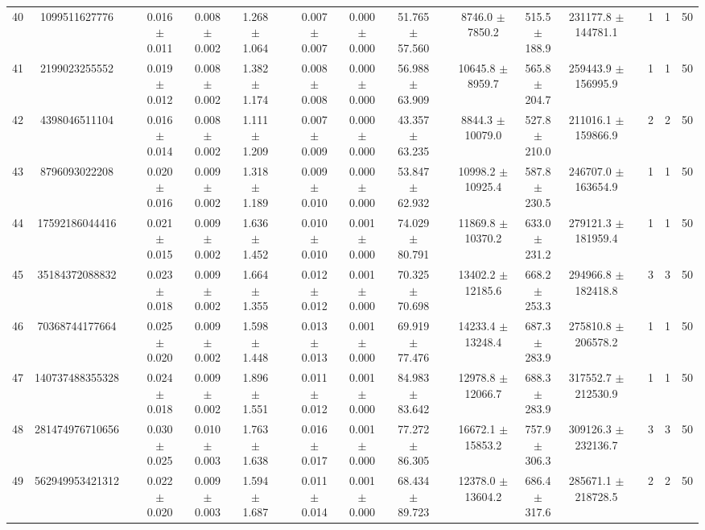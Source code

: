 \documentclass[11pt]{article}
\begin{document}
\begin{landscape}
\begin{table}
\begin{tabular}{cccccccccccccccccc}
40 & 1099511627776 &&  0.016 $\pm$ 0.011 & 0.008 $\pm$ 0.002 & 1.268 $\pm$ 1.064 &&  0.007 $\pm$ 0.007 & 0.000 $\pm$ 0.000 & 51.765 $\pm$ 57.560 &&  8746.0 $\pm$ 7850.2 & 515.5 $\pm$ 188.9 & 231177.8 $\pm$ 144781.1 && 1& 1& 50\\
41 & 2199023255552 &&  0.019 $\pm$ 0.012 & 0.008 $\pm$ 0.002 & 1.382 $\pm$ 1.174 &&  0.008 $\pm$ 0.008 & 0.000 $\pm$ 0.000 & 56.988 $\pm$ 63.909 &&  10645.8 $\pm$ 8959.7 & 565.8 $\pm$ 204.7 & 259443.9 $\pm$ 156995.9 && 1& 1& 50\\
42 & 4398046511104 &&  0.016 $\pm$ 0.014 & 0.008 $\pm$ 0.002 & 1.111 $\pm$ 1.209 &&  0.007 $\pm$ 0.009 & 0.000 $\pm$ 0.000 & 43.357 $\pm$ 63.235 &&  8844.3 $\pm$ 10079.0 & 527.8 $\pm$ 210.0 & 211016.1 $\pm$ 159866.9 && 2& 2& 50\\
43 & 8796093022208 &&  0.020 $\pm$ 0.016 & 0.009 $\pm$ 0.002 & 1.318 $\pm$ 1.189 &&  0.009 $\pm$ 0.010 & 0.000 $\pm$ 0.000 & 53.847 $\pm$ 62.932 &&  10998.2 $\pm$ 10925.4 & 587.8 $\pm$ 230.5 & 246707.0 $\pm$ 163654.9 && 1& 1& 50\\
44 & 17592186044416 &&  0.021 $\pm$ 0.015 & 0.009 $\pm$ 0.002 & 1.636 $\pm$ 1.452 &&  0.010 $\pm$ 0.010 & 0.001 $\pm$ 0.000 & 74.029 $\pm$ 80.791 &&  11869.8 $\pm$ 10370.2 & 633.0 $\pm$ 231.2 & 279121.3 $\pm$ 181959.4 && 1& 1& 50\\
45 & 35184372088832 &&  0.023 $\pm$ 0.018 & 0.009 $\pm$ 0.002 & 1.664 $\pm$ 1.355 &&  0.012 $\pm$ 0.012 & 0.001 $\pm$ 0.000 & 70.325 $\pm$ 70.698 &&  13402.2 $\pm$ 12185.6 & 668.2 $\pm$ 253.3 & 294966.8 $\pm$ 182418.8 && 3& 3& 50\\
46 & 70368744177664 &&  0.025 $\pm$ 0.020 & 0.009 $\pm$ 0.002 & 1.598 $\pm$ 1.448 &&  0.013 $\pm$ 0.013 & 0.001 $\pm$ 0.000 & 69.919 $\pm$ 77.476 &&  14233.4 $\pm$ 13248.4 & 687.3 $\pm$ 283.9 & 275810.8 $\pm$ 206578.2 && 1& 1& 50\\
47 & 140737488355328 &&  0.024 $\pm$ 0.018 & 0.009 $\pm$ 0.002 & 1.896 $\pm$ 1.551 &&  0.011 $\pm$ 0.012 & 0.001 $\pm$ 0.000 & 84.983 $\pm$ 83.642 &&  12978.8 $\pm$ 12066.7 & 688.3 $\pm$ 283.9 & 317552.7 $\pm$ 212530.9 && 1& 1& 50\\
48 & 281474976710656 &&  0.030 $\pm$ 0.025 & 0.010 $\pm$ 0.003 & 1.763 $\pm$ 1.638 &&  0.016 $\pm$ 0.017 & 0.001 $\pm$ 0.000 & 77.272 $\pm$ 86.305 &&  16672.1 $\pm$ 15853.2 & 757.9 $\pm$ 306.3 & 309126.3 $\pm$ 232136.7 && 3& 3& 50\\
49 & 562949953421312 &&  0.022 $\pm$ 0.020 & 0.009 $\pm$ 0.003 & 1.594 $\pm$ 1.687 &&  0.011 $\pm$ 0.014 & 0.001 $\pm$ 0.000 & 68.434 $\pm$ 89.723 &&  12378.0 $\pm$ 13604.2 & 686.4 $\pm$ 317.6 & 285671.1 $\pm$ 218728.5 && 2& 2& 50\\

\end{tabular}
\end{table}
\end{landscape}
\end{document}
